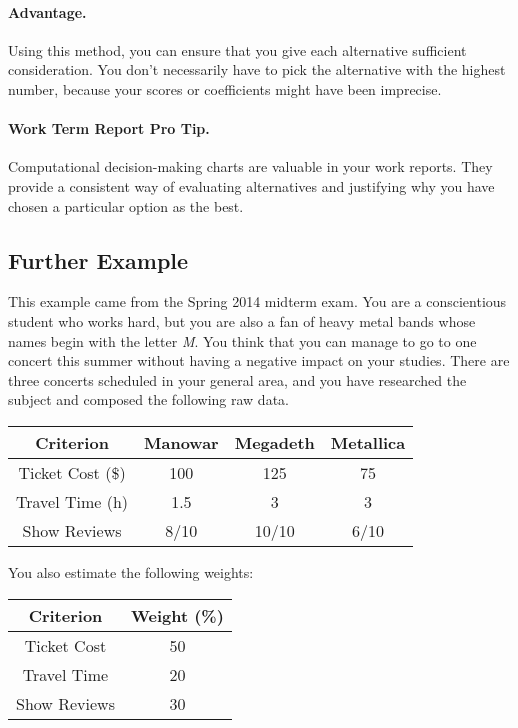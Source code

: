 \paragraph{Advantage.} Using this method, you can ensure that you give
each alternative sufficient consideration. You don't necessarily have to
pick the alternative with the highest number, because your scores or
coefficients might have been imprecise.

\paragraph{Work Term Report Pro Tip.} Computational decision-making charts are valuable in your work reports. They provide a consistent way of evaluating alternatives and justifying why you have chosen a particular option as the best.

\subsection*{Further Example}
This example came from the Spring 2014 midterm exam. You are a conscientious student who works hard, but you are also a fan of heavy metal bands whose names begin with the letter \textit{M}. You think that you can manage to go to one concert this summer without having a negative impact on your studies. There are three concerts scheduled in your general area, and you have researched the subject and composed the following raw data.

\begin{table}[h]
\begin{center}
	\begin{tabular}{c|c|c|c}
	\textbf{Criterion} & \textbf{Manowar} & \textbf{Megadeth} & \textbf{Metallica}\\
		\hline
		Ticket Cost (\$) & 100 & 125 & 75\\
		Travel Time (h) & 1.5 & 3 & 3 \\
		Show Reviews & 8/10 & 10/10 & 6/10 \\
	\end{tabular}
\end{center}
\end{table}

You also estimate the following weights:

\begin{table}[h]
\begin{center}
	\begin{tabular}{c|c}
	\textbf{Criterion} & Weight (\%)\\
		\hline
		Ticket Cost & 50\\
		Travel Time & 20\\
		Show Reviews & 30
	\end{tabular}
\end{center}
\end{table}


